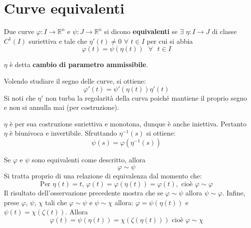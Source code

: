 \section{Curve equivalenti}
\begin{definition}
    Due curve $\varphi: I\to \mathbb{R}^n$ e $\psi:J\to \mathbb{R}^n$ si dicono \textbf{equivalenti} se $\exists$ $\eta:I\to J$ di classe $C^1(I)$ suriettiva e tale che $\eta'(t) \neq 0$ $\forall$ $t \in I$ per cui si abbia
    \begin{equation*}
        \varphi(t)=\psi(\eta(t)) \text{ } \forall \text{ } t \in I
    \end{equation*}
\end{definition}
\begin{oss}
    $\eta$ è detta \textbf{cambio di parametro ammissibile}. 
\end{oss}
\begin{oss}
    Volendo studiare il segno delle curve, si ottiene:
    \begin{equation*}
        \varphi'(t)=\psi'(\eta(t))\eta'(t)
    \end{equation*}
    Si noti che $\eta'$ non turba la regolarità della curva poiché mantiene il proprio segno e non si annulla mai (per costruzione).
\end{oss}
\begin{oss}
    $\eta$ è per sua costruzione suriettiva e monotona, dunque è anche iniettiva. Pertanto $\eta$ è biunivoca e invertibile. Sfruttando $\eta^{-1}(s)$ si ottiene:
    \begin{equation*}
        \psi(s)=\varphi(\eta^{-1}(s))
    \end{equation*}
\end{oss}
\begin{oss}
    Se $\varphi$ e $\psi$ sono equivalenti come descritto, allora
    \begin{equation*}
        \varphi\sim\psi
    \end{equation*}
    Si tratta proprio di una relazione di equivalenza dal momento che:
    \begin{equation*}
        \text{Per } \eta(t)=t \text{, } \varphi(t)=\varphi(\eta(t))=\varphi(t), \text{ cioè } \varphi\sim\varphi
    \end{equation*}
    Il risultato dell'osservazione precedente mostra che se $\varphi\sim\psi$ allora $\psi\sim\varphi$.
    Infine, prese $\varphi$, $\psi$, $\chi$ tali che $\varphi\sim\psi$ e $\psi\sim\chi$ allora:
    $\varphi=\psi(\eta(t))$ e $\psi(t)=\chi(\zeta(t))$. Allora
    \begin{equation*}
        \varphi(t)=\psi(\eta(t))=\chi(\zeta(\eta(t))) \text{ cioè } \varphi\sim\chi
    \end{equation*}
\end{oss}
